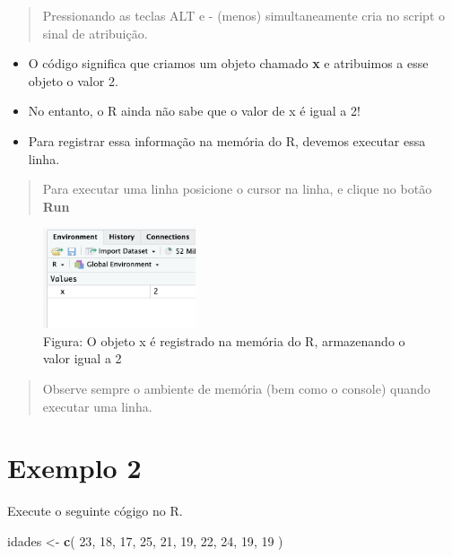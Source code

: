 \documentclass[
]{book}
\newenvironment{Shaded}{\begin{snugshade}}{\end{snugshade}}
\newcommand{\DecValTok}[1]{\textcolor[rgb]{0.00,0.00,0.81}{#1}}
\newcommand{\FunctionTok}[1]{\textcolor[rgb]{0.13,0.29,0.53}{\textbf{#1}}}
\newcommand{\NormalTok}[1]{#1}
\newcommand{\OtherTok}[1]{\textcolor[rgb]{0.56,0.35,0.01}{#1}}
\begin{document}
\begin{quote}
Pressionando as teclas ALT e - (menos) simultaneamente cria no script o sinal de atribuição.
\end{quote}

\begin{itemize}
\item
  O código significa que criamos um objeto chamado \textbf{x} e atribuimos a esse objeto o valor 2.
\item
  No entanto, o R ainda não sabe que o valor de x é igual a 2!
\item
  Para registrar essa informação na memória do R, devemos executar essa linha.
\end{itemize}

\begin{quote}
Para executar uma linha posicione o cursor na linha, e clique no botão \textbf{Run}
\end{quote}

\begin{figure}
\centering
\includegraphics[width=0.4\textwidth,height=\textheight]{telaValorMemoria.png}
\caption{Figura: O objeto x é registrado na memória do R, armazenando o valor igual a 2}
\end{figure}

\begin{quote}
Observe sempre o ambiente de memória (bem como o console) quando executar uma linha.
\end{quote}

\section{Exemplo 2}\label{exemplo-2}

Execute o seguinte cógigo no R.

\begin{Shaded}
\begin{Highlighting}[]
\NormalTok{idades }\OtherTok{\textless{}{-}} \FunctionTok{c}\NormalTok{( }\DecValTok{23}\NormalTok{, }\DecValTok{18}\NormalTok{, }\DecValTok{17}\NormalTok{, }\DecValTok{25}\NormalTok{, }\DecValTok{21}\NormalTok{, }\DecValTok{19}\NormalTok{, }\DecValTok{22}\NormalTok{, }\DecValTok{24}\NormalTok{, }\DecValTok{19}\NormalTok{, }\DecValTok{19}\NormalTok{ )}
\end{Highlighting}
\end{Shaded}
\end{document}
